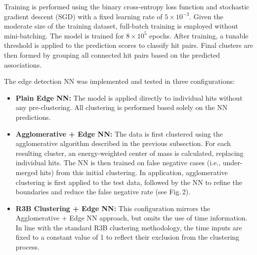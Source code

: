 \documentclass[final,5p,times,twocolumn]{elsarticle}
\begin{document}
Training is performed using the binary cross-entropy loss function and stochastic gradient descent (SGD) with a fixed learning rate of $5 \times 10^{-3}$. Given the moderate size of the training dataset, full-batch training is employed without mini-batching. The model is trained for $8 \times 10^5$ epochs. After training, a tunable threshold is applied to the prediction scores to classify hit pairs. Final clusters are then formed by grouping all connected hit pairs based on the predicted associations.

The edge detection NN was implemented and tested in three configurations:

\begin{itemize}
    \item \textbf{Plain Edge NN:} The model is applied directly to individual hits without any pre-clustering. All clustering is performed based solely on the NN predictions.

    \item \textbf{Agglomerative + Edge NN:} The data is first clustered using the agglomerative algorithm described in the previous subsection. For each resulting cluster, an energy-weighted center of mass is calculated, replacing individual hits. The NN is then trained on false negative cases (i.e., under-merged hits) from this initial clustering. In application, agglomerative clustering is first applied to the test data, followed by the NN to refine the boundaries and reduce the false negative rate (see Fig.\,2).

    \item \textbf{R3B Clustering + Edge NN:} This configuration mirrors the Agglomerative + Edge NN approach, but omits the use of time information. In line with the standard R3B clustering methodology, the time inputs are fixed to a constant value of 1 to reflect their exclusion from the clustering process.
\end{itemize}
\end{document}
